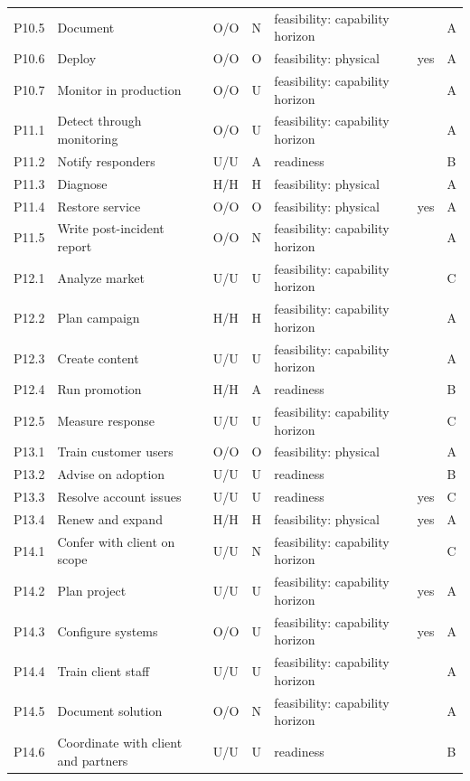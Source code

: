 \begin{longtable}{@{}lp{4.4cm}llp{4.2cm}rll@{}}
P10.5 & Document & O/O & N & feasibility: capability horizon &  &  & A \\
P10.6 & Deploy & O/O & O & feasibility: physical &  & yes & A \\
P10.7 & Monitor in production & O/O & U & feasibility: capability horizon &  &  & A \\
P11.1 & Detect through monitoring & O/O & U & feasibility: capability horizon &  &  & A \\
P11.2 & Notify responders & U/U & A & readiness &  &  & B \\
P11.3 & Diagnose & H/H & H & feasibility: physical &  &  & A \\
P11.4 & Restore service & O/O & O & feasibility: physical &  & yes & A \\
P11.5 & Write post-incident report & O/O & N & feasibility: capability horizon &  &  & A \\
P12.1 & Analyze market & U/U & U & feasibility: capability horizon &  &  & C \\
P12.2 & Plan campaign & H/H & H & feasibility: capability horizon &  &  & A \\
P12.3 & Create content & U/U & U & feasibility: capability horizon &  &  & A \\
P12.4 & Run promotion & H/H & A & readiness &  &  & B \\
P12.5 & Measure response & U/U & U & feasibility: capability horizon &  &  & C \\
P13.1 & Train customer users & O/O & O & feasibility: physical &  &  & A \\
P13.2 & Advise on adoption & U/U & U & readiness &  &  & B \\
P13.3 & Resolve account issues & U/U & U & readiness &  & yes & C \\
P13.4 & Renew and expand & H/H & H & feasibility: physical &  & yes & A \\
P14.1 & Confer with client on scope & U/U & N & feasibility: capability horizon &  &  & C \\
P14.2 & Plan project & U/U & U & feasibility: capability horizon &  & yes & A \\
P14.3 & Configure systems & O/O & U & feasibility: capability horizon &  & yes & A \\
P14.4 & Train client staff & U/U & U & feasibility: capability horizon &  &  & A \\
P14.5 & Document solution & O/O & N & feasibility: capability horizon &  &  & A \\
P14.6 & Coordinate with client and partners & U/U & U & readiness &  &  & B \\

\end{longtable}
